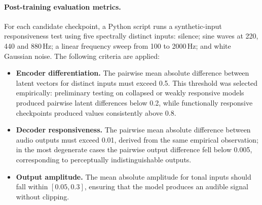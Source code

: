 \documentclass[a4paper,11pt,oneside,openany]{book}
\begin{document}
\paragraph{Post-training evaluation metrics.} For each candidate checkpoint, a Python script runs a synthetic-input responsiveness test using five spectrally distinct inputs: silence; sine waves at 220, 440 and 880\,Hz; a linear frequency sweep from 100 to 2000\,Hz; and white Gaussian noise. The following criteria are applied:
\begin{itemize}
\item \textbf{Encoder differentiation.} The pairwise mean absolute difference between latent vectors for distinct inputs must exceed 0.5. This threshold was selected empirically: preliminary testing on collapsed or weakly responsive models produced pairwise latent differences below 0.2, while functionally responsive checkpoints produced values consistently above 0.8.
\item \textbf{Decoder responsiveness.} The pairwise mean absolute difference between audio outputs must exceed 0.01, derived from the same empirical observation; in the most degenerate cases the pairwise output difference fell below 0.005, corresponding to perceptually indistinguishable outputs.
\item \textbf{Output amplitude.} The mean absolute amplitude for tonal inputs should fall within $[0.05, 0.3]$, ensuring that the model produces an audible signal without clipping.
\end{itemize}
\end{document}
